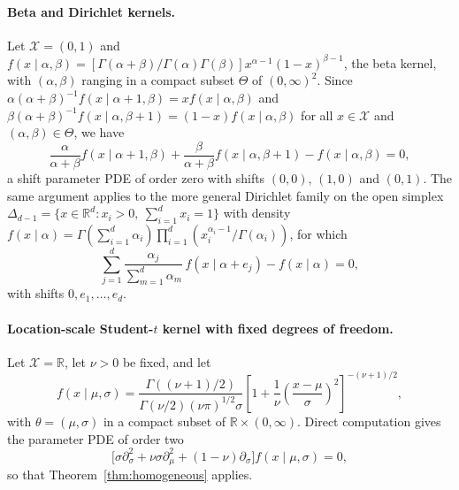 \documentclass[11pt,twoside]{article} %
\begin{document}
\paragraph{Beta and Dirichlet kernels.} Let $\mathcal X=(0,1)$ and $f(x\mid\alpha,\beta)=[\Gamma(\alpha+\beta)/\Gamma(\alpha)\Gamma(\beta)]x^{\alpha-1}(1-x)^{\beta-1}$, the beta kernel, with $(\alpha,\beta)$ ranging in a compact subset $\Theta$ of $(0,\infty)^2$. Since $\alpha(\alpha+\beta)^{-1}f(x\mid\alpha+1,\beta)=xf(x\mid\alpha,\beta)$ and $\beta(\alpha+\beta)^{-1}f(x\mid\alpha,\beta+1)=(1-x)f(x\mid\alpha,\beta)$ for all $x\in\mathcal X$ and $(\alpha,\beta)\in\Theta$, we have
%
\begin{equation*}
    \frac{\alpha}{\alpha+\beta}f(x\mid\alpha+1,\beta)+\frac{\beta}{\alpha+\beta}f(x\mid\alpha,\beta+1)-f(x\mid\alpha,\beta)=0,
\end{equation*}
%
a shift parameter PDE of order zero with shifts $(0,0)$, $(1,0)$ and $(0,1)$. The same argument applies to the more general Dirichlet family on the open simplex $\Delta_{d-1}=\{x\in\mathbb R^{d}:x_i>0,\ \sum_{i=1}^dx_i=1\}$ with density $f(x\mid\alpha)=\Gamma(\sum_{i=1}^d\alpha_i)\prod_{i=1}^d(x_i^{\alpha_i-1}/\Gamma(\alpha_i))$, for which
%
\begin{equation*}
    \sum_{j=1}^d\frac{\alpha_j}{\sum_{m=1}^d\alpha_m}\,f(x\mid\alpha+e_j)-f(x\mid\alpha)=0,
\end{equation*}
%
with shifts $0,e_1,\ldots,e_d$.


\paragraph{Location-scale Student-$t$ kernel with fixed degrees of freedom.} Let $\mathcal X=\mathbb R$, let $\nu>0$ be fixed, and let
%
\begin{equation*}
    f(x\mid\mu,\sigma)=\frac{\Gamma((\nu+1)/2)}{\Gamma(\nu/2)(\nu\pi)^{1/2}\sigma}\left[1+\frac1\nu\left(\frac{x-\mu}{\sigma}\right)^2\right]^{-(\nu+1)/2},
\end{equation*}
%
with $\theta=(\mu,\sigma)$ in a compact subset of $\mathbb R\times(0,\infty)$. Direct computation gives the parameter PDE of order two
%
\begin{equation*}
    \big[\sigma\partial^2_\sigma+\nu\sigma\partial^2_\mu+(1-\nu)\partial_\sigma\big]f(x\mid\mu,\sigma)=0,
\end{equation*}
%
so that Theorem~\ref{thm:homogeneous} applies.
\end{document}
